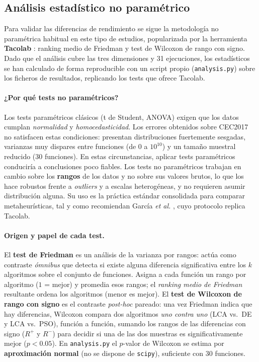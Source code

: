 \subsection{Análisis estadístico no paramétrico}

Para validar las diferencias de rendimiento se sigue la metodología no paramétrica
habitual en este tipo de estudios, popularizada por la herramienta \textbf{Tacolab}
\cite{tacolab}: ranking medio de Friedman y test de Wilcoxon de rango con signo.
Dado que el análisis cubre las tres dimensiones y 31 ejecuciones, los estadísticos se han
calculado de forma reproducible con un script propio (\texttt{analysis.py}) sobre los
ficheros de resultados, replicando los tests que ofrece Tacolab.

\paragraph{¿Por qué tests no paramétricos?}
Los tests paramétricos clásicos (t de Student, ANOVA) exigen que los datos cumplan
\emph{normalidad} y \emph{homocedasticidad}. Los errores obtenidos sobre CEC2017 no
satisfacen estas condiciones: presentan distribuciones fuertemente sesgadas, varianzas
muy dispares entre funciones (de $0$ a $10^{10}$) y un tamaño muestral reducido
(30 funciones). En estas circunstancias, aplicar tests paramétricos conduciría a
conclusiones poco fiables. Los tests no paramétricos trabajan en cambio sobre los
\textbf{rangos} de los datos y no sobre sus valores brutos, lo que los hace robustos
frente a \emph{outliers} y a escalas heterogéneas, y no requieren asumir distribución
alguna. Su uso es la práctica estándar consolidada para comparar metaheurísticas, tal
y como recomiendan García \emph{et al.} \cite{garcia2009study}, cuyo protocolo replica
Tacolab.

\paragraph{Origen y papel de cada test.}
El \textbf{test de Friedman} \cite{friedman1937} es un análisis de la varianza por
rangos: actúa como contraste \emph{ómnibus} que detecta si existe alguna diferencia
significativa entre los $k$ algoritmos sobre el conjunto de funciones. Asigna a cada
función un rango por algoritmo ($1$ = mejor) y promedia esos rangos; el \emph{ranking
medio de Friedman} resultante ordena los algoritmos (menor es mejor). El \textbf{test
de Wilcoxon de rango con signo} \cite{wilcoxon1945} es el contraste \emph{post-hoc}
pareado: una vez Friedman indica que hay diferencias, Wilcoxon compara dos algoritmos
\emph{uno contra uno} (LCA vs.\ DE y LCA vs.\ PSO), función a función, sumando los rangos
de las diferencias con signo ($R^+$ y $R^-$) para decidir si una de las dos muestras es
significativamente mejor ($p<0.05$). En \texttt{analysis.py} el $p$-valor de Wilcoxon se
estima por \textbf{aproximación normal} (no se dispone de \texttt{scipy}), suficiente con
30 funciones.

